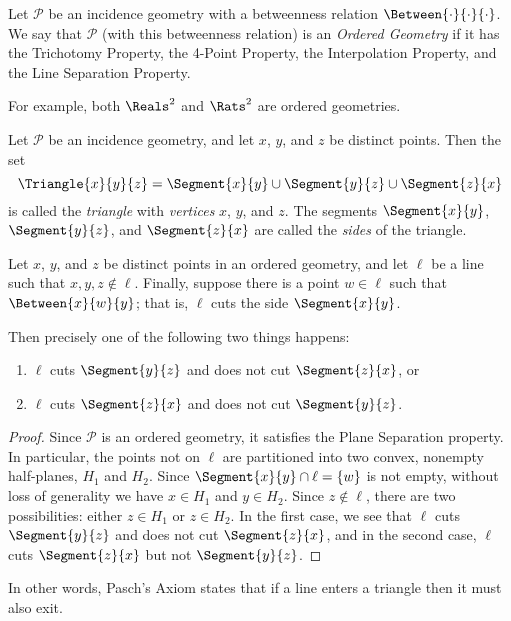 \documentclass{article}
\begin{document}
\begin{dfn}
Let $\mathcal{P}$ be an incidence geometry with a betweenness relation $\Between{\cdot}{\cdot}{\cdot}$. We say that $\mathcal{P}$ (with this betweenness relation) is an \emph{Ordered Geometry} if it has the Trichotomy Property, the 4-Point Property, the Interpolation Property, and the Line Separation Property.
\end{dfn}

For example, both $\Reals^2$ and $\Rats^2$ are ordered geometries.

\begin{dfn}[Triangle]
Let $\mathcal{P}$ be an incidence geometry, and let $x$, $y$, and $z$ be distinct points. Then the set \[ \Triangle{x}{y}{z} = \Segment{x}{y} \cup \Segment{y}{z} \cup \Segment{z}{x} \] is called the \emph{triangle} with \emph{vertices} $x$, $y$, and $z$. The segments $\Segment{x}{y}$, $\Segment{y}{z}$, and $\Segment{z}{x}$ are called the \emph{sides} of the triangle.
\end{dfn}

\begin{thm}
Let $x$, $y$, and $z$ be distinct points in an ordered geometry, and let $\ell$ be a line such that $x,y,z \notin \ell$. Finally, suppose there is a point $w \in \ell$ such that $\Between{x}{w}{y}$; that is, $\ell$ cuts the side $\Segment{x}{y}$.

Then precisely one of the following two things happens:
\begin{enumerate}
\item $\ell$ cuts $\Segment{y}{z}$ and does not cut $\Segment{z}{x}$, or
\item $\ell$ cuts $\Segment{z}{x}$ and does not cut $\Segment{y}{z}$.
\end{enumerate}
\end{thm}

\begin{proof}
Since $\mathcal{P}$ is an ordered geometry, it satisfies the Plane Separation property. In particular, the points not on $\ell$ are partitioned into two convex, nonempty half-planes, $H_1$ and $H_2$. Since $\Segment{x}{y} \cap \ell = \{w\}$ is not empty, without loss of generality we have $x \in H_1$ and $y \in H_2$. Since $z \notin \ell$, there are two possibilities: either $z \in H_1$ or $z \in H_2$. In the first case, we see that $\ell$ cuts $\Segment{y}{z}$ and does not cut $\Segment{z}{x}$, and in the second case, $\ell$ cuts $\Segment{z}{x}$ but not $\Segment{y}{z}$.
\end{proof}

In other words, Pasch's Axiom states that if a line enters a triangle then it must also exit.
\end{document}
